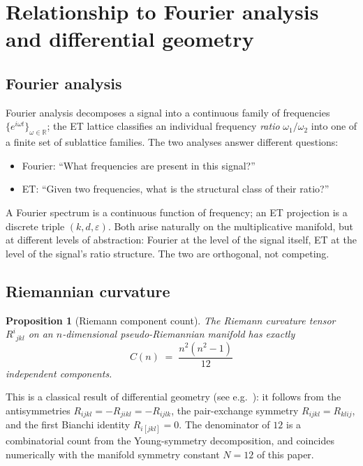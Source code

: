 \documentclass[11pt,a4paper]{article}
\newtheorem{proposition}[theorem]{Proposition}
\theoremstyle{definition}
\theoremstyle{remark}
\newcommand{\R}{\mathbb{R}}
\newcommand{\eps}{\varepsilon}
\begin{document}
\section{Relationship to Fourier analysis and differential geometry}\label{sec:comparison}

\subsection{Fourier analysis}

Fourier analysis decomposes a signal into a continuous family of frequencies $\{e^{i\omega t}\}_{\omega\in\R}$; the ET lattice classifies an individual frequency \emph{ratio} $\omega_{1}/\omega_{2}$ into one of a finite set of sublattice families. The two analyses answer different questions:
\begin{itemize}[leftmargin=*]
\item Fourier: ``What frequencies are present in this signal?''
\item ET: ``Given two frequencies, what is the structural class of their ratio?''
\end{itemize}

A Fourier spectrum is a continuous function of frequency; an ET projection is a discrete triple $(k,d,\eps)$. Both arise naturally on the multiplicative manifold, but at different levels of abstraction: Fourier at the level of the signal itself, ET at the level of the signal's ratio structure. The two are orthogonal, not competing.

\subsection{Riemannian curvature}

\begin{proposition}[Riemann component count]\label{prop:riemann}
The Riemann curvature tensor $R^{i}{}_{jkl}$ on an $n$-dimensional pseudo-Riemannian manifold has exactly
\[
C(n) \;=\; \frac{n^{2}(n^{2}-1)}{12}
\]
independent components.
\end{proposition}

This is a classical result of differential geometry (see e.g.~\cite{MTW}): it follows from the antisymmetries $R_{ijkl} = -R_{jikl} = -R_{ijlk}$, the pair-exchange symmetry $R_{ijkl} = R_{klij}$, and the first Bianchi identity $R_{i[jkl]} = 0$. The denominator of $12$ is a combinatorial count from the Young-symmetry decomposition, and coincides numerically with the manifold symmetry constant $N=12$ of this paper.
\end{document}
